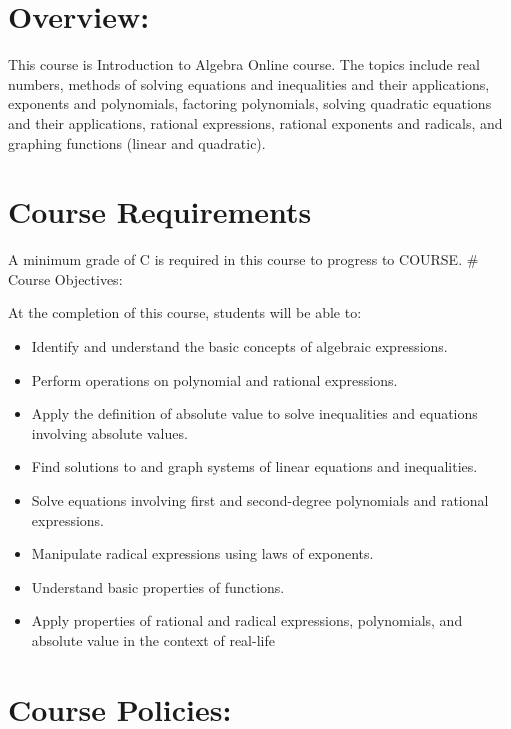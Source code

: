 \documentclass[]{article}
\providecommand{\tightlist}{%
  \setlength{\itemsep}{0pt}\setlength{\parskip}{0pt}}
\begin{document}
\hypertarget{overview}{%
\section{Overview:}\label{overview}}

This course is Introduction to Algebra Online course. The topics include
real numbers, methods of solving equations and inequalities and their
applications, exponents and polynomials, factoring polynomials, solving
quadratic equations and their applications, rational expressions,
rational exponents and radicals, and graphing functions (linear and
quadratic).

\hypertarget{course-requirements}{%
\section{Course Requirements}\label{course-requirements}}

A minimum grade of C is required in this course to progress to COURSE.
\# Course Objectives:

At the completion of this course, students will be able to:

\begin{itemize}
\tightlist
\item
  Identify and understand the basic concepts of algebraic expressions.
\item
  Perform operations on polynomial and rational expressions.
\item
  Apply the definition of absolute value to solve inequalities and
  equations involving absolute values.
\item
  Find solutions to and graph systems of linear equations and
  inequalities.
\item
  Solve equations involving first and second-degree polynomials and
  rational expressions.
\item
  Manipulate radical expressions using laws of exponents.
\item
  Understand basic properties of functions.
\item
  Apply properties of rational and radical expressions, polynomials, and
  absolute value in the context of real-life
\end{itemize}

\hypertarget{course-policies}{%
\section{Course Policies:}\label{course-policies}}
\end{document}
